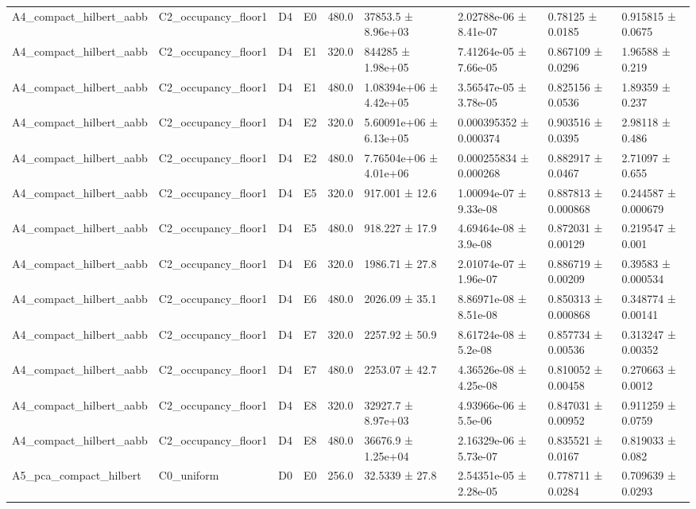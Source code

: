\begin{table}
\begin{tabular}{lllllllll}
A4\_compact\_hilbert\_aabb & C2\_occupancy\_floor1 & D4 & E0 & 480.0 & 37853.5 ± 8.96e+03 & 2.02788e-06 ± 8.41e-07 & 0.78125 ± 0.0185 & 0.915815 ± 0.0675 \\
A4\_compact\_hilbert\_aabb & C2\_occupancy\_floor1 & D4 & E1 & 320.0 & 844285 ± 1.98e+05 & 7.41264e-05 ± 7.66e-05 & 0.867109 ± 0.0296 & 1.96588 ± 0.219 \\
A4\_compact\_hilbert\_aabb & C2\_occupancy\_floor1 & D4 & E1 & 480.0 & 1.08394e+06 ± 4.42e+05 & 3.56547e-05 ± 3.78e-05 & 0.825156 ± 0.0536 & 1.89359 ± 0.237 \\
A4\_compact\_hilbert\_aabb & C2\_occupancy\_floor1 & D4 & E2 & 320.0 & 5.60091e+06 ± 6.13e+05 & 0.000395352 ± 0.000374 & 0.903516 ± 0.0395 & 2.98118 ± 0.486 \\
A4\_compact\_hilbert\_aabb & C2\_occupancy\_floor1 & D4 & E2 & 480.0 & 7.76504e+06 ± 4.01e+06 & 0.000255834 ± 0.000268 & 0.882917 ± 0.0467 & 2.71097 ± 0.655 \\
A4\_compact\_hilbert\_aabb & C2\_occupancy\_floor1 & D4 & E5 & 320.0 & 917.001 ± 12.6 & 1.00094e-07 ± 9.33e-08 & 0.887813 ± 0.000868 & 0.244587 ± 0.000679 \\
A4\_compact\_hilbert\_aabb & C2\_occupancy\_floor1 & D4 & E5 & 480.0 & 918.227 ± 17.9 & 4.69464e-08 ± 3.9e-08 & 0.872031 ± 0.00129 & 0.219547 ± 0.001 \\
A4\_compact\_hilbert\_aabb & C2\_occupancy\_floor1 & D4 & E6 & 320.0 & 1986.71 ± 27.8 & 2.01074e-07 ± 1.96e-07 & 0.886719 ± 0.00209 & 0.39583 ± 0.000534 \\
A4\_compact\_hilbert\_aabb & C2\_occupancy\_floor1 & D4 & E6 & 480.0 & 2026.09 ± 35.1 & 8.86971e-08 ± 8.51e-08 & 0.850313 ± 0.000868 & 0.348774 ± 0.00141 \\
A4\_compact\_hilbert\_aabb & C2\_occupancy\_floor1 & D4 & E7 & 320.0 & 2257.92 ± 50.9 & 8.61724e-08 ± 5.2e-08 & 0.857734 ± 0.00536 & 0.313247 ± 0.00352 \\
A4\_compact\_hilbert\_aabb & C2\_occupancy\_floor1 & D4 & E7 & 480.0 & 2253.07 ± 42.7 & 4.36526e-08 ± 4.25e-08 & 0.810052 ± 0.00458 & 0.270663 ± 0.0012 \\
A4\_compact\_hilbert\_aabb & C2\_occupancy\_floor1 & D4 & E8 & 320.0 & 32927.7 ± 8.97e+03 & 4.93966e-06 ± 5.5e-06 & 0.847031 ± 0.00952 & 0.911259 ± 0.0759 \\
A4\_compact\_hilbert\_aabb & C2\_occupancy\_floor1 & D4 & E8 & 480.0 & 36676.9 ± 1.25e+04 & 2.16329e-06 ± 5.73e-07 & 0.835521 ± 0.0167 & 0.819033 ± 0.082 \\
A5\_pca\_compact\_hilbert & C0\_uniform & D0 & E0 & 256.0 & 32.5339 ± 27.8 & 2.54351e-05 ± 2.28e-05 & 0.778711 ± 0.0284 & 0.709639 ± 0.0293 \\

\end{tabular}
\end{table}
